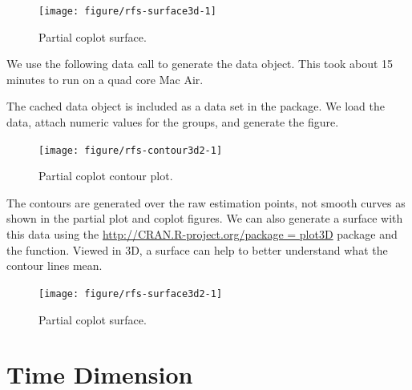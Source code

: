 \documentclass[nojss]{jss}\usepackage[]{graphicx}\usepackage[]{color}
\begin{document}
\begin{Schunk}
\begin{figure}[!htpb]

{\centering \texttt{[image: figure/rfs-surface3d-1]} 

}

\caption[Partial coplot surface]{Partial coplot surface.\label{fig:surface3d}}
\end{figure}
\end{Schunk}





We use the following data call to generate the  data object. This took about 15 minutes to run on a quad core Mac Air.



The cached  data object is included as a data set in the  package. We load the data, attach numeric values for the  groups, and generate the figure.

\begin{Schunk}
\begin{figure}[!htpb]

{\centering \texttt{[image: figure/rfs-contour3d2-1]} 

}

\caption[Partial coplot contour plot]{Partial coplot contour plot.\label{fig:contour3d2}}
\end{figure}
\end{Schunk}

The contours are generated over the raw  estimation points, not smooth curves as shown in the partial plot and coplot figures. We can also generate a surface with this data using the  \url{http://CRAN.R-project.org/package = plot3D} package and the  function. Viewed in 3D, a surface can help to better understand what the contour lines mean. 

\begin{Schunk}
\begin{figure}[!htpb]

{\centering \texttt{[image: figure/rfs-surface3d2-1]} 

}

\caption[Partial coplot surface]{Partial coplot surface.\label{fig:surface3d2}}
\end{figure}
\end{Schunk}
\section{Time Dimension}
\end{document}
